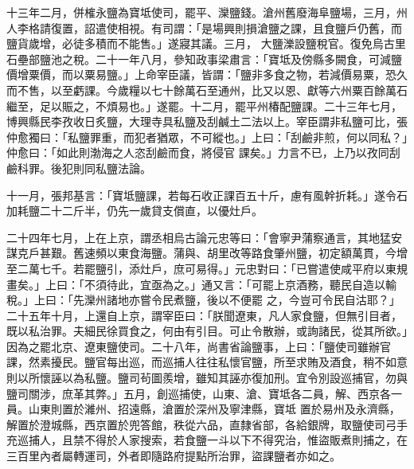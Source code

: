 \begin{pinyinscope}
 十三年二月，併榷永鹽為寶坻使司，罷平、灤鹽錢。滄州舊廢海阜鹽場，三月，州人李格請復置，詔遣使相視。有司謂：「是場興則損滄鹽之課，且食鹽戶仍舊，而鹽貨歲增，必徒多積而不能售。」遂寢其議。三月，
 大鹽濼設鹽稅官。復免烏古里石壘部鹽池之稅。二十一年八月，參知政事梁肅言：「寶坻及傍縣多闕食，可減鹽價增粟價，而以粟易鹽。」上命宰臣議，皆謂：「鹽非多食之物，若減價易粟，恐久而不售，以至虧課。今歲糧以七十餘萬石至通州，比又以恩、獻等六州粟百餘萬石繼至，足以賑之，不煩易也。」遂罷。十二月，罷平州椿配鹽課。二十三年七月，博興縣民李孜收日炙鹽，大理寺具私鹽及刮鹹土二法以上。宰臣謂非私鹽可比，張仲愈獨曰：「私鹽罪重，而犯者猶眾，不可縱也。」上曰：「刮鹼非煎，何以同私？」仲愈曰：「如此則渤海之人恣刮鹼而食，將侵官
 課矣。」力言不已，上乃以孜同刮鹼科罪。後犯則同私鹽法論。



 十一月，張邦基言：「寶坻鹽課，若每石收正課百五十斤，慮有風幹折耗。」遂令石加耗鹽二十二斤半，仍先一歲貸支償直，以優灶戶。



 二十四年七月，上在上京，謂丞相烏古論元忠等曰：「會寧尹蒲察通言，其地猛安謀克戶甚艱。舊速頻以東食海鹽。蒲與、胡里改等路食肇州鹽，初定額萬貫，今增至二萬七千。若罷鹽引，添灶戶，庶可易得。」元忠對曰：「已嘗遣使咸平府以東規畫矣。」上曰：「不須待此，宜亟為之。」通又言：「可罷上京酒務，聽民自造以輸稅。」上曰：「先灤州諸地亦嘗令民煮鹽，後以不便罷
 之，今豈可令民自沽耶？」二十五年十月，上還自上京，謂宰臣曰：「朕聞遼東，凡人家食鹽，但無引目者，既以私治罪。夫細民徐買食之，何由有引目。可止令散辦，或詢諸民，從其所欲。」因為之罷北京、遼東鹽使司。二十八年，尚書省論鹽事，上曰：「鹽使司雖辦官課，然素擾民。鹽官每出巡，而巡捕人往往私懷官鹽，所至求賄及酒食，稍不如意則以所懷誣以為私鹽。鹽司茍圖羨增，雖知其誣亦復加刑。宜令別設巡捕官，勿與鹽司關涉，庶革其弊。」五月，創巡捕使，山東、滄、寶坻各二員，解、西京各一員。山東則置於濰州、招遠縣，滄置於深州及寧津縣，寶坻
 置於易州及永濟縣，解置於澄城縣，西京置於兜答館，秩從六品，直隸省部，各給銀牌，取鹽使司弓手充巡捕人，且禁不得於人家搜索，若食鹽一斗以下不得究治，惟盜販煮則捕之，在三百里內者屬轉運司，外者即隨路府提點所治罪，盜課鹽者亦如之。




\end{pinyinscope}
